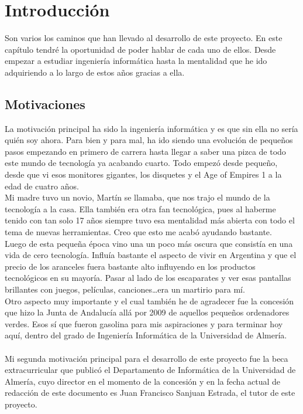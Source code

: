 \chapter{Introducción}

Son varios los caminos que han llevado al desarrollo de este proyecto. En este capítulo tendré la oportunidad de poder hablar de cada uno de ellos. Desde empezar a estudiar ingeniería informática hasta la mentalidad que he ido adquiriendo a lo largo de estos años gracias a ella.

\section{Motivaciones}

La motivación principal ha sido la ingeniería informática y es que sin ella no sería quién soy ahora. Para bien y para mal, ha ido siendo una evolución de pequeños pasos empezando en primero de carrera hasta llegar a saber una pizca de todo este mundo de tecnología ya acabando cuarto. Todo empezó desde pequeño, desde que vi esos monitores gigantes, los disquetes y el Age of Empires 1 a la edad de cuatro años.
\\Mi madre tuvo un novio, Martín se llamaba, que nos trajo el mundo de la tecnología a la casa. Ella también era otra fan tecnológica, pues al haberme tenido con tan solo 17 años siempre tuvo esa mentalidad más abierta con todo el tema de nuevas herramientas. Creo que esto me acabó ayudando bastante.
\\Luego de esta pequeña época vino una un poco más oscura que consistía en una vida de cero tecnología. Influía bastante el aspecto de vivir en Argentina y que el precio de los aranceles fuera bastante alto influyendo en los productos tecnológicos en su mayoría. Pasar al lado de los escaparates y ver esas pantallas brillantes con juegos, películas, canciones\ldots era un martirio para mí.
\\Otro aspecto muy importante y el cual también he de agradecer fue la concesión que hizo la Junta de Andalucía allá por 2009 de aquellos pequeños ordenadores verdes. Esos sí que fueron gasolina para mis aspiraciones y para terminar hoy aquí, dentro del grado de Ingeniería Informática de la Universidad de Almería.
\\\\Mi segunda motivación principal para el desarrollo de este proyecto fue la beca extracurricular que publicó el Departamento de Informática de la Universidad de Almería, cuyo director en el momento de la concesión y en la fecha actual de redacción de este documento es Juan Francisco Sanjuan Estrada, el tutor de este proyecto.
